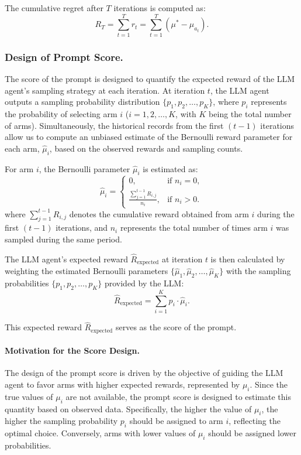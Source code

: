 The cumulative regret after \(T\) iterations is computed as:
\[
R_T = \sum_{t=1}^{T} r_t = \sum_{t=1}^{T} \left( \mu^* - \mu_{a_t} \right).
\]



\subsubsection{Design of Prompt Score.}
The score of the prompt is designed to quantify the expected reward of the LLM agent's sampling strategy at each iteration. At iteration \( t \), the LLM agent outputs a sampling probability distribution \( \{ p_1, p_2, \dots, p_K \} \), where \( p_i \) represents the probability of selecting arm \( i \) (\( i = 1, 2, \dots, K \), with \( K \) being the total number of arms). Simultaneously, the historical records from the first \( (t-1) \) iterations allow us to compute an unbiased estimate of the Bernoulli reward parameter for each arm, \( \hat{\mu}_i \), based on the observed rewards and sampling counts.

For arm \( i \), the Bernoulli parameter \( \hat{\mu}_i \) is estimated as:
\[
\hat{\mu}_i = 
\begin{cases} 
0, & \text{if } n_i = 0, \\
\frac{\sum_{j=1}^{t-1} R_{i,j}}{n_i}, & \text{if } n_i > 0.
\end{cases}
\]
where \( \sum_{j=1}^{t-1} R_{i,j} \) denotes the cumulative reward obtained from arm \( i \) during the first \( (t-1) \) iterations, and \( n_i \) represents the total number of times arm \( i \) was sampled during the same period.

The LLM agent's expected reward \( \hat{R}_{\text{expected}} \) at iteration \( t \) is then calculated by weighting the estimated Bernoulli parameters \( \{\hat{\mu}_1, \hat{\mu}_2, \dots, \hat{\mu}_K\} \) with the sampling probabilities \( \{ p_1, p_2, \dots, p_K \} \) provided by the LLM:
\[
\hat{R}_{\text{expected}} = \sum_{i=1}^{K} p_i \cdot \hat{\mu}_i.
\]

This expected reward \( \hat{R}_{\text{expected}} \) serves as the score of the prompt.

\paragraph{Motivation for the Score Design.}
The design of the prompt score is driven by the objective of guiding the LLM agent to favor arms with higher expected rewards, represented by \( \mu_i \). Since the true values of \( \mu_i \) are not available, the prompt score is designed to estimate this quantity based on observed data. Specifically, the higher the value of \( \mu_i \), the higher the sampling probability \( p_i \) should be assigned to arm \( i \), reflecting the optimal choice. Conversely, arms with lower values of \( \mu_i \) should be assigned lower probabilities.

